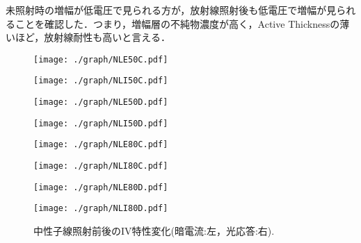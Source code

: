 未照射時の増幅が低電圧で見られる方が，放射線照射後も低電圧で増幅が見られることを確認した．つまり，増幅層の不純物濃度が高く，Active Thicknessの薄いほど，放射線耐性も高いと言える．\par
\begin{figure}[H]
\begin{minipage}{0.55\hsize}
	\centering
	\texttt{[image: ./graph/NLE50C.pdf]}
\end{minipage}
\begin{minipage}{0.45\hsize}
	\centering
	\texttt{[image: ./graph/NLI50C.pdf]}
\end{minipage}
\begin{minipage}{0.55\hsize}
	\centering
	\texttt{[image: ./graph/NLE50D.pdf]}
\end{minipage}
\begin{minipage}{0.45\hsize}
	\centering
	\texttt{[image: ./graph/NLI50D.pdf]}
\end{minipage}
\begin{minipage}{0.55\hsize}
	\centering
	\texttt{[image: ./graph/NLE80C.pdf]}
\end{minipage}
\begin{minipage}{0.45\hsize}
	\centering
	\texttt{[image: ./graph/NLI80C.pdf]}
\end{minipage}
\begin{minipage}{0.55\hsize}
	\centering
	\texttt{[image: ./graph/NLE80D.pdf]}
\end{minipage}
\begin{minipage}{0.45\hsize}
	\centering
	\texttt{[image: ./graph/NLI80D.pdf]}
\end{minipage}
 	\caption{中性子線照射前後のIV特性変化(暗電流:左，光応答:右).}
	\label{fig:N}
\end{figure}
